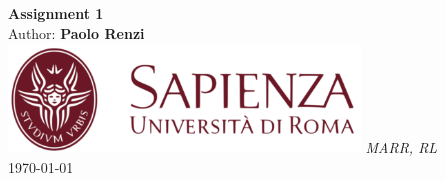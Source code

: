 \documentclass[10pt,a4paper]{article}
\begin{document}
\begin{titlepage}
    \begin{center}
        \vspace*{1cm}
        \Huge\textbf{Assignment 1}\\
        \vspace{1.5cm}
        \Large Author:
        \textbf{Paolo Renzi}\\
        \vspace{0.5cm}
        \vfill
        \includegraphics[width=0.7\textwidth]{images/sapienza_logo.png}
        \vfill
        \vspace{0.8cm}
        \Large \textit{MARR, RL}\\
        \today
    \end{center}
\end{titlepage}
\newpage
\end{document}
